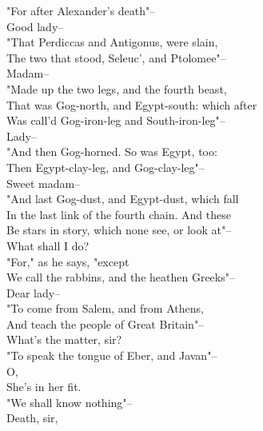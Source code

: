 \documentclass{memoir}
\begin{document}
\begin{drama*}
\dolspeaks  "For after Alexander's death"--\\
\mammonspeaks {} Good lady--\\
\dolspeaks  "That Perdiccas and Antigonus, were slain,\\
 The two that stood, Seleuc', and Ptolomee"--\\
\mammonspeaks  Madam--\\
\dolspeaks {} "Made up the two legs, and the fourth beast,\\
 That was Gog-north, and Egypt-south: which after\\
 Was call'd Gog-iron-leg and South-iron-leg"--\\
\mammonspeaks  Lady--\\
\dolspeaks {} "And then Gog-horned. So was Egypt, too:\\
 Then Egypt-clay-leg, and Gog-clay-leg"--\\
\mammonspeaks {} Sweet madam--\\
\dolspeaks  "And last Gog-dust, and Egypt-dust, which fall\\
 In the last link of the fourth chain. And these\\
 Be stars in story, which none see, or look at"--\\
\mammonspeaks  What shall I do?\\
\dolspeaks {} "For," as he says, "except\\
 We call the rabbins, and the heathen Greeks"--\\
\mammonspeaks  Dear lady--\\
\dolspeaks {} "To come from Salem, and from Athens,\\
 And teach the people of Great Britain"--\\
\facespeaks {} What's the matter, sir?\\
\dolspeaks  "To speak the tongue of Eber, and Javan"--\\
\mammonspeaks  O,\\
 She's in her fit.\\
\dolspeaks {} "We shall know nothing"--\\
\facespeaks {} Death, sir,\\

\end{drama*}
\end{document}
